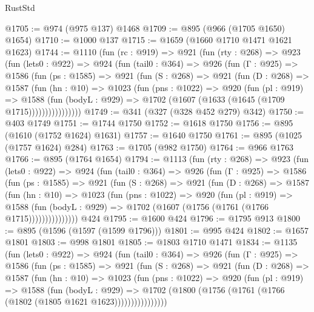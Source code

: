 \begin{lexlean}{RustStd}
\begin{coremodule}
{\begin{coremodule}
{{{{{{{{{@1705 := @974 (@975 @137) @1468
@1709 := @895 (@966 (@1705 @1650) @1654)
@1710 := @1000 @137
@1715 := @1659 (@1660 @1710 @1471 @1621 @1623)
@1744 := @1110
    (fun (rc : @919) =>
    @921
      (fun (rty : @268) =>
      @923
        (fun (lets0 : @922) =>
        @924
          (fun (tail0 : @364) =>
          @926
            (fun (Γ : @925) =>
            @1586
              (fun (ps : @1585) =>
              @921
                (fun (S : @268) =>
                @921
                  (fun (D : @268) =>
                  @1587
                    (fun (hn : @10) =>
                    @1023
                      (fun (pns : @1022) =>
                      @920
                        (fun (pl : @919) =>
                        @1588
                          (fun (bodyL : @929) =>
                          @1702 (@1607 (@1633 (@1645 (@1709 @1715))))))))))))))))
@1749 := @341 (@327 (@328 @452 @279) @342)
@1750 := @403 @1749
@1751 := @1744 @1750
@1752 := @1618 @1750
@1756 := @895 (@1610 (@1752 @1624) @1631)
@1757 := @1640 @1750
@1761 := @895 (@1025 (@1757 @1624) @284)
@1763 := @1705 (@982 @1750)
@1764 := @966 @1763
@1766 := @895 (@1764 @1654)
@1794 := @1113
    (fun (rty : @268) =>
    @923
      (fun (lets0 : @922) =>
      @924
        (fun (tail0 : @364) =>
        @926
          (fun (Γ : @925) =>
          @1586
            (fun (ps : @1585) =>
            @921
              (fun (S : @268) =>
              @921
                (fun (D : @268) =>
                @1587
                  (fun (hn : @10) =>
                  @1023
                    (fun (pns : @1022) =>
                    @920
                      (fun (pl : @919) =>
                      @1588
                        (fun (bodyL : @929) =>
                        @1702 (@1607 (@1756 (@1761 (@1766 @1715)))))))))))))))
    @424
@1795 := @1600 @424
@1796 := @1795 @913
@1800 := @895 (@1596 (@1597 (@1599 @1796)))
@1801 := @995 @424
@1802 := @1657 @1801
@1803 := @998 @1801
@1805 := @1803 @1710 @1471
@1834 := @1135
    (fun (lets0 : @922) =>
    @924
      (fun (tail0 : @364) =>
      @926
        (fun (Γ : @925) =>
        @1586
          (fun (ps : @1585) =>
          @921
            (fun (S : @268) =>
            @921
              (fun (D : @268) =>
              @1587
                (fun (hn : @10) =>
                @1023
                  (fun (pns : @1022) =>
                  @920
                    (fun (pl : @919) =>
                    @1588
                      (fun (bodyL : @929) =>
                      @1702 (@1800 (@1756 (@1761 (@1766 (@1802 (@1805 @1621 @1623))))))))))))))))
}}}}}}}}}
\end{coremodule}}
\end{coremodule}
\end{lexlean}
